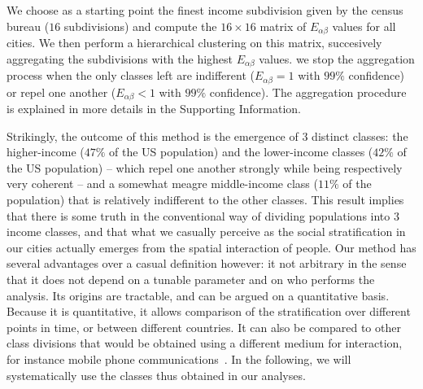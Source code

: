 We choose as a starting point the finest income subdivision given by the census
bureau ($16$ subdivisions) and compute the $16 \times 16$ matrix of $E_{\alpha
\beta}$ values for all cities. We then perform a hierarchical clustering on this
matrix, succesively aggregating the subdivisions with the highest $E_{\alpha
\beta}$ values. we stop the aggregation process when the only classes left are
indifferent ($E_{\alpha \beta} = 1$ with $99\%$ confidence) or
repel one another ($E_{\alpha \beta} < 1$ with $99\%$ confidence). The
aggregation procedure is explained in more details in the Supporting 
Information.

Strikingly, the outcome of this method is the emergence of 3 distinct classes:
the higher-income ($47\%$ of the US population) and the lower-income classes
($42\%$ of the US population) -- which repel one another strongly while being
respectively very coherent -- and a somewhat meagre middle-income class ($11\%$
of the population) that is relatively indifferent to the other classes. This
result implies that there is some truth in the conventional way of dividing
populations into $3$ income classes, and that what we casually perceive as the
social stratification in our cities actually emerges from the spatial
interaction of people. Our method has several advantages over a casual
definition however: it not arbitrary in the sense that it does not depend on a
tunable parameter and on who performs the analysis. Its origins are tractable,
and can be argued on a quantitative basis. Because it is quantitative, it allows
comparison of the stratification over different points in time, or between
different countries. It can also be compared to other class divisions that would
be obtained using a different medium for interaction, for instance mobile phone
communications~\cite{Eagle:2010}. In the following, we will systematically use
the classes thus obtained in our analyses.

